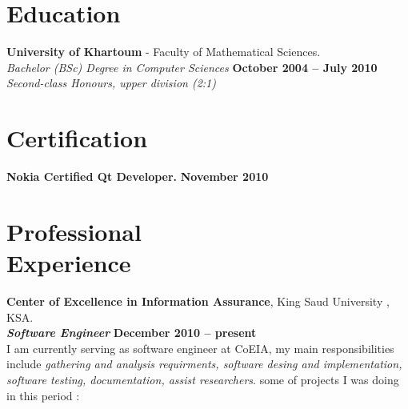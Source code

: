 \documentclass[margin,line]{resume}
\begin{document}
\begin{resume}
    \section{\mysidestyle Education}

    \textbf{University of Khartoum} - Faculty of Mathematical Sciences. \vspace{2mm}\\\vspace{1mm}%
    \textsl{Bachelor (BSc) Degree in Computer Sciences} \hfill \textbf{ October 2004 -- July 2010} \\%
    \textsl{Second-class Honours, upper division (2:1)}\vspace{-3mm}\\\vspace{-1mm}%

    \section{\mysidestyle Certification}

    \textbf{Nokia Certified Qt Developer.} \hfill \textbf{November 2010} \vspace{-3mm}\\\vspace{-1mm}%

    \section{\mysidestyle Professional\\Experience}

    \textbf{Center of Excellence in Information Assurance}, King Saud University , KSA. \vspace{2mm}\\\vspace{1mm}%
    \textsl{\textbf{Software Engineer}} \hfill \textbf{December 2010 -- present}\\
     I am currently serving as software engineer at CoEIA, my main responsibilities include \textsl{gathering and analysis requirments, software desing and implementation, software testing, documentation, assist researchers}. some of projects I was doing in this period :


\end{resume}
\end{document}
